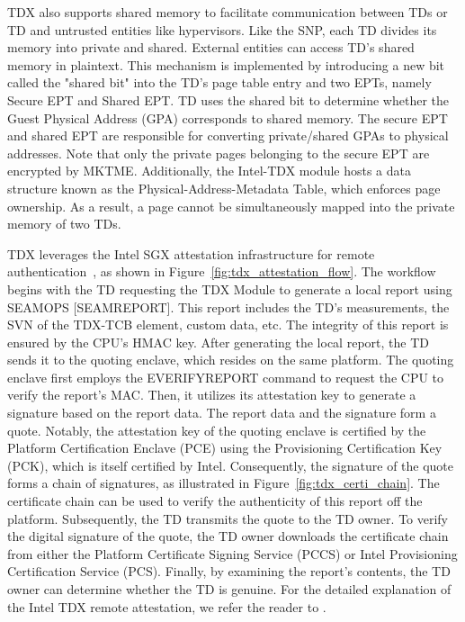 TDX also supports shared memory to facilitate communication between TDs or TD and untrusted entities like hypervisors. Like the SNP, each TD divides its memory into private and shared. External entities can access TD's shared memory in plaintext. This mechanism is implemented by introducing a 
new bit called the "shared bit" into the TD's page table entry and two EPTs, namely Secure EPT and Shared EPT. TD uses the shared bit to determine whether the Guest Physical Address (GPA) corresponds to shared memory. The secure EPT and shared EPT are responsible for converting private/shared 
GPAs to physical addresses. Note that only the private pages belonging to the secure EPT are encrypted by MKTME. Additionally, the Intel-TDX module hosts a data structure known as the Physical-Address-Metadata Table, which enforces page ownership. As a result, a page cannot be simultaneously 
mapped into the private memory of two TDs.


TDX leverages the Intel SGX attestation infrastructure for remote authentication~\cite*{Intel_tdx_whitepaper}, as shown in Figure~\ref{fig:tdx_attestation_flow}.
The workflow begins with the TD requesting the TDX Module to generate a local report using SEAMOPS [SEAMREPORT]. This report includes the TD's measurements, the SVN of the TDX-TCB element, custom data, etc. The integrity of this report is ensured by the CPU's HMAC key.
After generating the local report, the TD sends it to the quoting enclave,  which resides on the same platform. The quoting enclave first employs the EVERIFYREPORT command to request the CPU to verify the report's MAC. Then, it utilizes its attestation key to generate a signature based on the 
report data. The report data and the signature form a quote. Notably, the attestation key of the quoting enclave is certified by the Platform Certification Enclave (PCE) using the Provisioning Certification Key (PCK), which is itself certified by Intel.
Consequently, the signature of the quote forms a chain of signatures, as illustrated in Figure~\ref{fig:tdx_certi_chain}. The certificate chain can be used to verify the authenticity of this report off the platform. Subsequently, the TD transmits the quote to the TD owner. To verify the digital signature of the quote, 
the TD owner downloads the certificate chain from either the Platform Certificate Signing Service (PCCS) or Intel Provisioning Certification Service (PCS). Finally, by examining the report's contents, the TD owner can determine whether the TD is genuine.  For the detailed explanation of the Intel TDX remote attestation, we 
refer the reader to \cite*{Intel_tdx_whitepaper, 9448036, DBLP:journals/corr/abs-2303-15540}.

